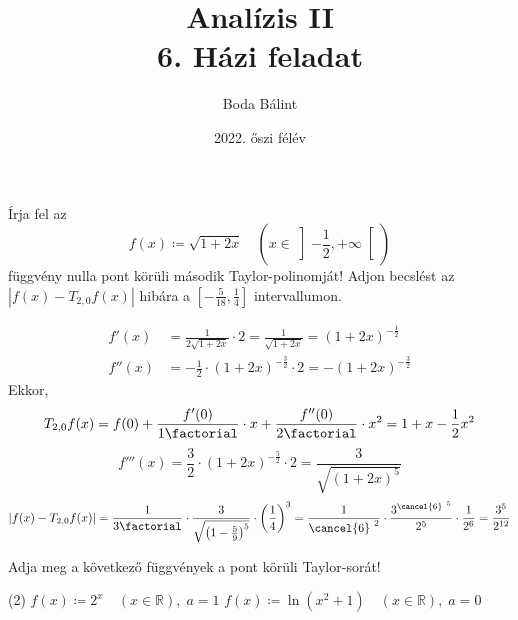 \documentclass[a4paper,12pt]{article}
\title{\huge{Analízis II} \\ \large 6. Házi feladat}
\author{Boda Bálint}
\date{2022. őszi félév}
\theoremstyle{definition}
\begin{document}
    \maketitle
    \begin{question}
        Írja fel az
        \[
        f(x) \coloneq \sqrt{1+2x} \quad \left( x \in \left] -\frac{1}{2},+\infty\right[ \right) 
        \]
        függvény nulla pont körüli második Taylor-polinomját! Adjon becslést az $ |f(x) - T_{2,0}f(x)| $ hibára a $ \left[ -\frac{5}{18},\frac{1}{4} \right]  $ intervallumon.
    \end{question}
	\begin{solution}
		\begin{align*}
			f'(x) &= \frac{1}{2\sqrt{1+2x}} \cdot 2 = \frac{1}{\sqrt{1+2x}} = (1+2x)^{-\frac{1}{2}} \\
			f''(x) &= -\frac{1}{2} \cdot (1+2x)^{-\frac{3}{2}} \cdot 2 = - (1+2x)^{-\frac{3}{2}}
		\end{align*}
	Ekkor,
	\[
	T_{2,0}f(x) = f(0) + \frac{f'(0)}{1\factorial} \cdot x + \frac{f''(0)}{2\factorial} \cdot x^2 = 1 + x - \frac{1}{2} x^2
	\]
	\[
	f'''(x) = \frac{3}{2} \cdot (1+2x)^{-\frac{5}{2}} \cdot 2 = \frac{3}{\sqrt{(1+2x)^5}}
	\]
	\[
	|f(x) - T_{2,0}f(x)| = \frac{1}{3\factorial} \cdot \frac{3}{\sqrt{\left(1 - \frac{5}{9}\right)^5}} \cdot \left( \frac{1}{4} \right)^{3} = \frac{1}{ \cancel{6}^{~2} } \cdot \frac{ 3^{\cancel{6}^{~5}} }{2^5} \cdot \frac{1}{2^6} = \frac{3^5}{2^{12}}
	\]
	\end{solution}
	\begin{question}
		Adja meg a következő függvények a pont körüli Taylor-sorát!
		\begin{tasks}(2)
			\task $f(x) \coloneq 2^x \quad (x \in \mathbb{R}), \; a = 1 $
			\task $f(x) \coloneq \ln{(x^2+1)} \quad (x \in \mathbb{R}), \; a = 0$
		\end{tasks}
	\end{question}
\end{document}
